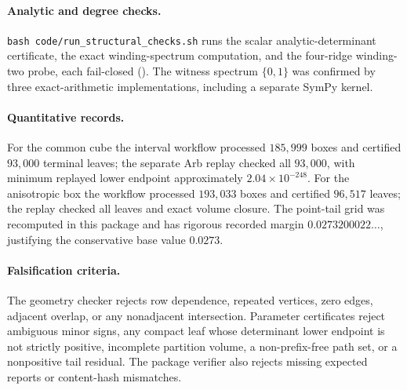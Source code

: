 \documentclass[11pt,twoside,leqno]{article}
\theoremstyle{plain}
\theoremstyle{definition}
\theoremstyle{remark}
\begin{document}
\paragraph{Analytic and degree checks.} \texttt{bash code/run\_structural\_checks.sh} runs the scalar analytic-determinant certificate, the exact winding-spectrum computation, and the four-ridge winding-two probe, each fail-closed (). The witness spectrum $\{0,1\}$ was confirmed by three exact-arithmetic implementations, including a separate SymPy kernel.

\paragraph{Quantitative records.} For the common cube the interval workflow processed $185{,}999$ boxes and certified $93{,}000$ terminal leaves; the separate Arb replay checked all $93{,}000$, with minimum replayed lower endpoint approximately $2.04\times10^{-248}$.  For the anisotropic box the workflow processed $193{,}033$ boxes and certified $96{,}517$ leaves; the replay checked all leaves and exact volume closure.  The point-tail grid was recomputed in this package and has rigorous recorded margin $0.0273200022\ldots$, justifying the conservative base value $0.0273$.

\paragraph{Falsification criteria.} The geometry checker rejects row dependence, repeated vertices, zero edges, adjacent overlap, or any nonadjacent intersection.  Parameter certificates reject ambiguous minor signs, any compact leaf whose determinant lower endpoint is not strictly positive, incomplete partition volume, a non-prefix-free path set, or a nonpositive tail residual. The package verifier also rejects missing expected reports or content-hash mismatches.
\end{document}
